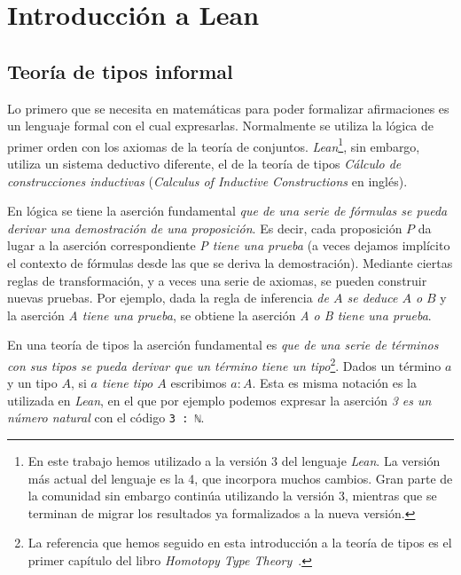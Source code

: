 \section{Introducci\'{o}n a Lean}

\subsection{Teoría de tipos informal}

Lo primero que se necesita en matemáticas para poder formalizar afirmaciones es
un lenguaje formal con el cual expresarlas. Normalmente se utiliza la lógica de
primer orden con los axiomas de la teoría de conjuntos.
\textit{Lean}\footnote{En este trabajo hemos utilizado a la versión 3 del
	lenguaje \textit{Lean}. La versión más actual del lenguaje es la 4, que
	incorpora muchos cambios. Gran parte de la comunidad sin embargo continúa
	utilizando la versión 3, mientras que se terminan de migrar los resultados ya
	formalizados a la nueva versión.}, sin embargo, utiliza un sistema deductivo
diferente, el de la teoría de tipos \textit{Cálculo de construcciones
	inductivas} (\textit{Calculus of Inductive Constructions} en inglés).

En lógica se tiene la aserción fundamental \textit{que de una serie de fórmulas
	se pueda derivar una demostración de una proposición}. Es decir, cada
proposición $P$ da lugar a la aserción correspondiente \textit{P tiene una
	prueba} (a veces dejamos implícito el contexto de fórmulas desde las que se
deriva la demostración). Mediante ciertas reglas de transformación, y a veces
una serie de axiomas, se pueden construir nuevas pruebas. Por ejemplo, dada la
regla de inferencia \textit{de $A$ se deduce $A$ o $B$} y la aserción \textit{A
	tiene una prueba}, se obtiene la aserción \textit{A o B tiene una prueba}.

En una teoría de tipos la aserción fundamental es \textit{que de una serie de
	términos con sus tipos se pueda derivar que un término tiene un
	tipo}\footnote{La referencia que hemos seguido en esta introducción a la teoría
	de tipos es el primer capítulo del libro \textit{Homotopy Type
		Theory}~\cite{HomotopyTypeTheory}.}. Dados un término $a$ y un tipo $A$, si
\textit{$a$ tiene tipo $A$} escribimos $a:A$. Esta es misma notación es la
utilizada en \textit{Lean}, en el que por ejemplo podemos expresar la aserción
\textit{3 es un número natural} con el código \lstinline{3 : ℕ}.

